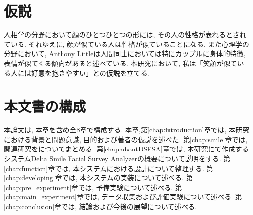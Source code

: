 \section{仮説}
人相学の分野において顔のひとつひとつの形には, その人の性格が表れるとされている.
それゆえに, 顔が似ている人は性格が似ていることになる.
また心理学の分野において, Anthony Littleは人間同士においては特にカップルに身体的特徴,
表情が似てくる傾向があると述べている.\cite{AnthonyLittle}
本研究において, 私は「笑顔が似ている人には好意を抱きやすい」との仮説を立てる.




\section{本文書の構成}

本論文は, 本章を含め全8章で構成する.
本章,第\ref{chap:introduction}章では, 本研究における背景と問題意識, 目的および著者の仮説を述べた.
第\ref{chap:smile}章では, 関連研究をについてまとめる.
第\ref{chap:aboutDSFSA}章では, 本研究にて作成するシステムDelta Smile Facial Survey Analyzerの概要について説明をする.
第\ref{chap:function}章では, 本システムにおける設計について整理する.
第\ref{chap:developing}章では, 本システムの実装について述べる.
第\ref{chap:pre_experiment}章では, 予備実験について述べる.
第\ref{chap:main_experiment}章では, データ収集および評価実験について述べる.
第\ref{chap:conclusion}章では, 結論および今後の展望について述べる.
